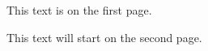 \documentclass{article}
\begin{document}
This text is on the first page.

\newpage

This text will start on the second page.
\end{document}
